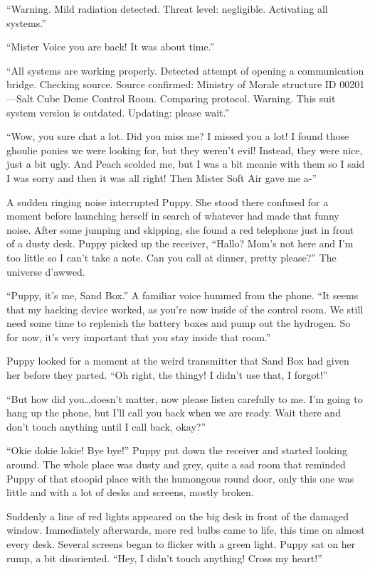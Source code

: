 {\mt ``Warning. Mild radiation detected. Threat level: negligible. Activating all systems.''}

``Mister Voice you are back! It was about time.''

{\mt ``All systems are working properly. Detected attempt of opening a communication bridge. Checking source. Source confirmed: Ministry of Morale structure ID 00201---Salt Cube Dome Control Room. Comparing protocol. Warning. This suit system version is outdated. Updating: please wait.''}

``Wow, you sure chat a lot. Did you miss me? I missed you a lot! I found those ghoulie ponies we were looking for, but they weren't evil! Instead, they were nice, just a bit ugly. And Peach scolded me, but I was a bit meanie with them so I said I was sorry and then it was all right! Then Mister Soft Air gave me a-''

A sudden ringing noise interrupted Puppy. She stood there confused for a moment before launching herself in search of whatever had made that funny noise. After some jumping and skipping, she found a red telephone just in front of a dusty desk. Puppy picked up the receiver, ``Hallo? Mom's not here and I'm too little so I can't take a note. Can you call at dinner, pretty please?'' The universe d'awwed.

``Puppy, it's me, Sand Box.'' A familiar voice hummed from the phone. ``It seems that my hacking device worked, as you're now inside of the control room. We still need some time to replenish the battery boxes and pump out the hydrogen. So for now, it's very important that you stay inside that room.''

Puppy looked for a moment at the weird transmitter that Sand Box had given her before they parted. ``Oh right, the thingy! I didn't use that, I forgot!''

``But how did you\dots doesn't matter, now please listen carefully to me. I'm going to hang up the phone, but I'll call you back when we are ready. Wait there and don't touch anything until I call back, okay?''

``Okie dokie lokie! Bye bye!'' Puppy put down the receiver and started looking around. The whole place was dusty and grey, quite a sad room that reminded Puppy of that stoopid place with the humongous round door, only this one was little and with a lot of desks and screens, mostly broken.

Suddenly a line of red lights appeared on the big desk in front of the damaged window. Immediately afterwards, more red bulbs came to life, this time on almost every desk. Several screens began to flicker with a green light. Puppy sat on her rump, a bit disoriented. ``Hey, I didn't touch anything! Cross my heart!''


